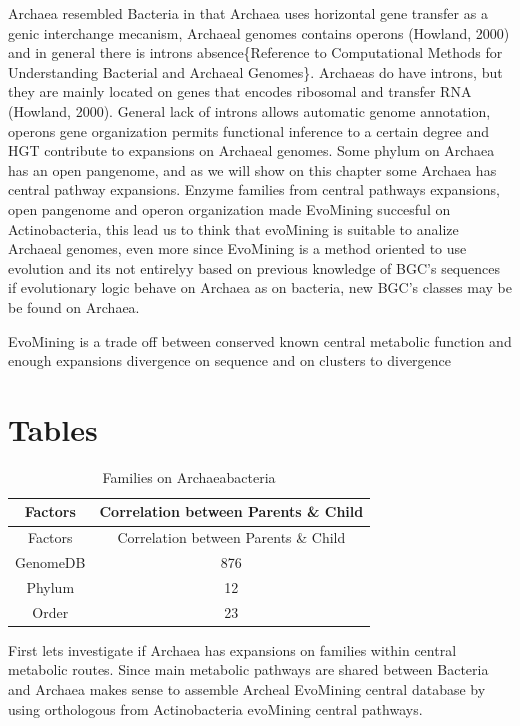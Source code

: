 \documentclass[12pt,twoside]{reedthesis}
\begin{document}
  Archaea resembled Bacteria in that Archaea uses horizontal gene transfer
  as a genic interchange mecanism, Archaeal genomes contains operons
  (Howland, 2000) and in general there is introns absence\{Reference to
  Computational Methods for Understanding Bacterial and Archaeal
  Genomes\}. Archaeas do have introns, but they are mainly located on
  genes that encodes ribosomal and transfer RNA (Howland, 2000). General
  lack of introns allows automatic genome annotation, operons gene
  organization permits functional inference to a certain degree and HGT
  contribute to expansions on Archaeal genomes. Some phylum on Archaea has
  an open pangenome, and as we will show on this chapter some Archaea has
  central pathway expansions. Enzyme families from central pathways
  expansions, open pangenome and operon organization made EvoMining
  succesful on Actinobacteria, this lead us to think that evoMining is
  suitable to analize Archaeal genomes, even more since EvoMining is a
  method oriented to use evolution and its not entirelyy based on previous
  knowledge of BGC's sequences if evolutionary logic behave on Archaea as
  on bacteria, new BGC's classes may be be found on Archaea.
  
  EvoMining is a trade off between conserved known central metabolic
  function and enough expansions divergence on sequence and on clusters to
  divergence
  
  \section{Tables}\label{tables}
  
  \begin{longtable}[c]{@{}cc@{}}
  \caption{Families on Archaeabacteria \label{tab:inher}}\tabularnewline
  \toprule
  Factors & Correlation between Parents \& Child\tabularnewline
  \midrule
  \endfirsthead
  \toprule
  Factors & Correlation between Parents \& Child\tabularnewline
  \midrule
  \endhead
  GenomeDB & 876\tabularnewline
  Phylum & 12\tabularnewline
  Order & 23\tabularnewline
  \bottomrule
  \end{longtable}
  
  \clearpage
  
  First lets investigate if Archaea has expansions on families within
  central metabolic routes. Since main metabolic pathways are shared
  between Bacteria and Archaea makes sense to assemble Archeal EvoMining
  central database by using orthologous from Actinobacteria evoMining
  central pathways.
  
\end{document}
